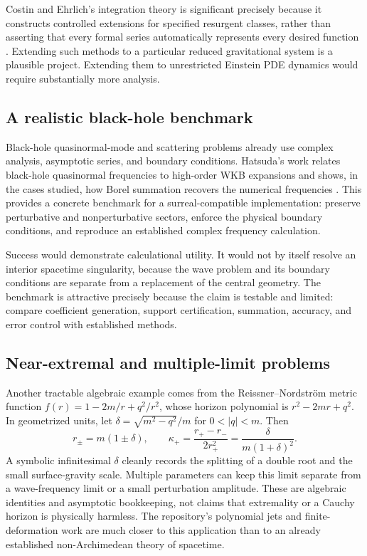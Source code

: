 \documentclass[11pt,letterpaper]{article}
\theoremstyle{definition}
\theoremstyle{remark}
\begin{document}
Costin and Ehrlich's integration theory is significant precisely because it
constructs controlled extensions for specified resurgent classes, rather than
asserting that every formal series automatically represents every desired
function \cite{CostinEhrlich}. Extending such methods to a particular reduced
gravitational system is a plausible project. Extending them to unrestricted
Einstein PDE dynamics would require substantially more analysis.

\subsection{A realistic black-hole benchmark}

Black-hole quasinormal-mode and scattering problems already use complex
analysis, asymptotic series, and boundary conditions. Hatsuda's work relates
black-hole quasinormal frequencies to high-order WKB expansions and shows, in
the cases studied, how Borel summation recovers the numerical frequencies
\cite{Hatsuda}. This provides a concrete benchmark for a surreal-compatible
implementation: preserve perturbative and nonperturbative sectors, enforce
the physical boundary conditions, and reproduce an established complex
frequency calculation.

Success would demonstrate calculational utility. It would not by itself
resolve an interior spacetime singularity, because the wave problem and its
boundary conditions are separate from a replacement of the central geometry.
The benchmark is attractive precisely because the claim is testable and
limited: compare coefficient generation, support certification, summation,
accuracy, and error control with established methods.

\subsection{Near-extremal and multiple-limit problems}

Another tractable algebraic example comes from the Reissner--Nordstr\"om
metric function $f(r)=1-2m/r+q^2/r^2$, whose horizon polynomial is
$r^2-2mr+q^2$. In geometrized units, let
$\delta=\sqrt{m^2-q^2}/m$ for $0<|q|<m$. Then
\[
 r_\pm=m(1\pm\delta),\qquad
 \kappa_+=\frac{r_+-r_-}{2r_+^2}
          =\frac{\delta}{m(1+\delta)^2}.
\]
A symbolic infinitesimal $\delta$ cleanly records the splitting of a double
root and the small surface-gravity scale. Multiple parameters can keep this
limit separate from a wave-frequency limit or a small perturbation amplitude.
These are algebraic identities and asymptotic bookkeeping, not claims that
extremality or a Cauchy horizon is physically harmless. The repository's
polynomial jets and finite-deformation work are much closer to this application
than to an already established non-Archimedean theory of spacetime.
\end{document}
